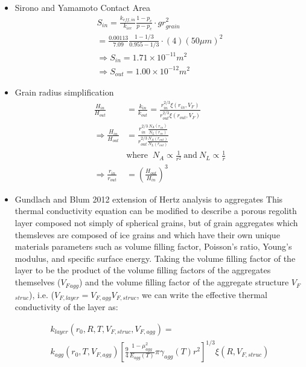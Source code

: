 \documentclass[11pt]{article} %
\newcommand{\vf}{\ensuremath{V_{F}}\xspace}
\begin{document}
\begin{itemize}
\begin{itemize}
\item Sirono and Yamamoto Contact Area
	\begin{equation}
	\begin{gathered}
	S_{in} = \frac{k_{eff, in}}{k_{ice}} \frac{1-p_{c}}{p - p_{c}}\cdot g r_{grain}^{2} \\
	= \frac{0.00113}{7.09} \frac{1-1/3}{0.955-1/3} \cdot (4)(50 \mu m)^2 \\
	\Rightarrow S_{in} = 1.71\times 10^{-11} m^{2} \\
	\Rightarrow S_{out} = 1.00\times 10^{-12} m^{2}
	\end{gathered}
	\end{equation}
	
\item Grain radius simplification
	\begin{equation}
	\begin{split}
	\frac{H_{in}}{H_{out}} &= \frac{k_{in}}{k_{out}} = \frac{r_{in}^{2/3} \xi(r_{in}, \vf)}{r_{out}^{2/3} \xi(r_{out}, \vf)} \\
	\Rightarrow \frac{H_{in}}{H_{out}} &= \frac{r_{in}^{2/3} \frac{N_{A}(r_{in})}{N_{L}(r_{in})}}{r_{out}^{2/3} \frac{N_{A}(r_{out})}{N_{L}(r_{out})}} \\
	& \text{where }\: N_{A}\varpropto \frac{1}{r^{2}} \: \text{and} \: N_{L}\varpropto \frac{1}{r} \\
	\Rightarrow \frac{r_{in}}{r_{out}} &= (\frac{H_{out}}{H_{in}})^{3}
	\end{split}
	\end{equation}

\item Gundlach and Blum 2012 extension of Hertz analysis to aggregates
	 This thermal conductivity equation can be modified to describe a porous regolith layer composed not simply of spherical grains, but of grain aggregates which themsleves are composed of ice grains and which have their own unique materials parameters such as volume filling factor, Poisson's ratio, Young's modulus, and specific surface energy. Taking the volume filling factor of the layer to be the product of the volume filling factors of the aggregates themselves (\vf$_{agg}$) and the volume filling factor of the aggregate structure \vf$_{struc}$), i.e. ($V_{F, layer} = V_{F, agg} V_{F, struc}$, we can write the effective thermal conductivity of the layer as:
	 
	 \begin{equation}
	 \begin{split}
	 k_{layer}(r_{0}, R, T, V_{F, struc}, V_{F, agg}) = \\
	 k_{agg}(r_{0}, T, V_{F, agg}) [\frac{9}{4} \frac{1 - \mu_{agg}^{2}}{E_{agg}(T)}  \pi \gamma_{agg}(T) r^{2}]^{1/3} \xi(R, V_{F, struc})
	 \end{split}
	 \end{equation}
	 

\end{itemize}
\end{itemize}
\end{document}
